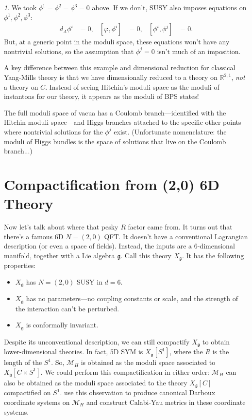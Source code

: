 \documentclass[oneside,english]{amsbook}
\numberwithin{section}{chapter}
\numberwithin{equation}{section}
\numberwithin{figure}{section}
\theoremstyle{plain}
\theoremstyle{definition}
\theoremstyle{remark}
\newtheorem*{rem*}{\protect\remarkname}
\theoremstyle{definition}
\theoremstyle{definition}
\theoremstyle{plain}
\providecommand{\remarkname}{Remark}
\begin{document}
\begin{rem*}
We took $\phi^{1}=\phi^{2}=\phi^{3}=0$ above. If we don't, SUSY also
imposes equations on $\phi^{1},\phi^{2},\phi^{3}$:
\begin{align*}
d_{A}\phi^{i} & =0, & \left[\varphi,\phi^{i}\right] & =0, & \left[\phi^{i},\phi^{j}\right] & =0.
\end{align*}
But, at a generic point in the moduli space, these equations won't
have any nontrivial solutions, so the assumption that $\phi^{j}=0$
isn't much of an imposition.
\end{rem*}

A key difference between this example and dimensional reduction for classical
Yang-Mills theory is that we have dimensionally reduced to a theory on $\mathbb{R}^{2,1}$,
\emph{not} a theory on $C$. Instead of seeing Hitchin's moduli space as the moduli of
instantons for our theory, it appears as the moduli of BPS states!

The full moduli space of vacua has a Coulomb branch---identified with
the Hitchin moduli space---and Higgs branches attached to the specific
other points where nontrivial solutions for the $\phi^{j}$ exist.
(Unfortunate nomenclature: the moduli of Higgs bundles is the space
of solutions that live on the Coulomb branch...)


\section{Compactification from (2,0) 6D Theory}

Now let's talk about where that pesky $R$ factor came from. It turns
out that there's a famous 6D $N=\left(2,0\right)$ QFT. It doesn't
have a conventional Lagrangian description (or even a space of fields).
Instead, the inputs are a 6-dimensional manifold, together with a
Lie algebra $\mathfrak{g}$. Call this theory $X_{\mathfrak{g}}$.
It has the following properties:
\begin{itemize}
\item $X_{\mathfrak{g}}$ has $N=\left(2,0\right)$ SUSY in $d=6$.
\item $X_{\mathfrak{g}}$ has no parameters---no coupling constants or scale,
and the strength of the interaction can't be perturbed.
\item $X_{\mathfrak{g}}$ is conformally invariant.
\end{itemize}
Despite its unconventional description, we can still compactify $X_{\mathfrak{g}}$
to obtain lower-dimensional theories. In fact, 5D SYM is $X_{\mathfrak{g}}\left[S^{1}\right]$,
where the $R$ is the length of the $S^{1}$. So, $\mathcal{M}_{H}$
is obtained as the moduli space associated to $X_{\mathfrak{g}}\left[C\times S^{1}\right]$.
We could perform this compactification in either order: $\mathcal{M}_{H}$
can also be obtained as the moduli space associated to the theory
$X_{\mathfrak{g}}\left[C\right]$ compactified on $S^{1}$. \cite{GMN}
use this observation to produce canonical Darboux coordinate systems
on $\mathcal{M}_{H}$ and construct Calabi-Yau metrics in these coordinate
systems.
\end{document}
